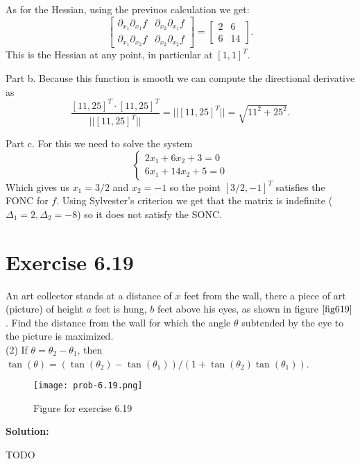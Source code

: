 \documentclass{article}
\begin{document}
As for the Hessian, using the previuos calculation we get:
\[
\begin{bmatrix}
\partial_{x_1}\partial_{x_1}f & \partial_{x_2}\partial_{x_1}f\\
\partial_{x_1}\partial_{x_2}f & \partial_{x_2}\partial_{x_2}f
\end{bmatrix}
=
\begin{bmatrix}
2 & 6\\
6 & 14
\end{bmatrix}.
\]
This is the Hessian at any point, in particular at $[1,1]^T$.

Part b. Because this function is smooth we can compute the directional
derivative as
\[
	\frac{[11,25]^T\cdot
	[11,25]^T}{||[11,25]^T||}=||[11,25]^T||=\sqrt{11^2+25^2}.
\]

Part c. For this we need to solve the system
\[
	\begin{cases}
	2x_1+6x_2+3=0\\
	6x_1+14x_2+5=0
	\end{cases}
\]
Which gives us $x_1=3/2$ and $x_2=-1$ so the point $[3/2,-1]^T$ satisfies the
FONC for $f$. Using Sylvester's criterion we get that the matrix is indefinite
($\Delta_1=2, \Delta_2=-8$)
so it does not satisfy the SONC.
\section*{Exercise 6.19}
An art collector stands at a distance of $x$ feet from the wall, there a piece
of art (picture) of height $a$ feet is hung, $b$ feet above his eyes, as shown
in figure $\ref{fig619}$. Find the distance from the wall for which the angle $\theta$
subtended by the eye to the picture is maximized.\\
(2) If $\theta = \theta_2 - \theta_1$, then
$\tan(\theta)=(\tan(\theta_2)-\tan(\theta_1))/(1+\tan(\theta_2)\tan(\theta_1))$.
\begin{figure}[ht]
	\center
	\caption{Figure for exercise 6.19}
	\texttt{[image: prob-6.19.png]}
	\label{fig619}
\end{figure}

\textbf{Solution:}

TODO
\end{document}
